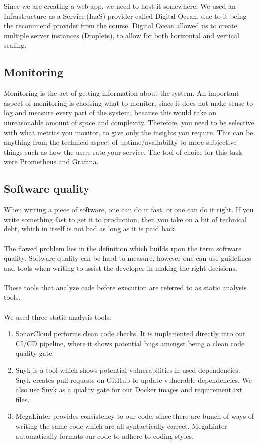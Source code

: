 Since we are creating a web app, we need to host it somewhere. We used an Infrastructure-as-a-Service (IaaS) provider called Digital Ocean, due to it being the recommend provider from the course. Digital Ocean allowed us to create multiple server instances (Droplets), to allow for both horizontal and vertical scaling.

\subsection*{Monitoring}

Monitoring is the act of getting information about the system. An important aspect of monitoring is choosing what to monitor, since it does not make sense to log and measure every part of the system, because this would take an unreasonable amount of space and complexity. Therefore, you need to be selective with what metrics you monitor, to give only the insights you require. This can be anything from the technical aspect of uptime/availability to more subjective things such as how the users rate your service. The tool of choice for this task were Prometheus and Grafana.

\subsection*{Software quality}

When writing a piece of software, one can do it fast, or one can do it right. If you write something fast to get it to production, then you take on a bit of technical debt, which in itself is not bad as long as it is paid back.
\\\\
The flawed problem lies in the definition which builds upon the term software quality. Software quality can be hard to measure, however one can use guidelines and tools when writing to assist the developer in making the right decisions.
\\\\
These tools that analyze code before execution are referred to as static analysis tools.
\\\\
We used three static analysis tools:
\begin{enumerate}
    \item SonarCloud performs clean code checks. It is implemented directly into our CI/CD pipeline, where it shows potential bugs amongst being a clean code quality gate.
    \item Snyk is a tool which shows potential vulnerabilities in used dependencies. Snyk creates pull requests on GitHub to update vulnerable dependencies. We also use Snyk as a quality gate for our Docker images and requirement.txt files.
    \item MegaLinter provides consistency to our code, since there are bunch of ways of writing the same code which are all syntactically correct. MegaLinter automatically formats our code to adhere to coding styles.
\end{enumerate}

